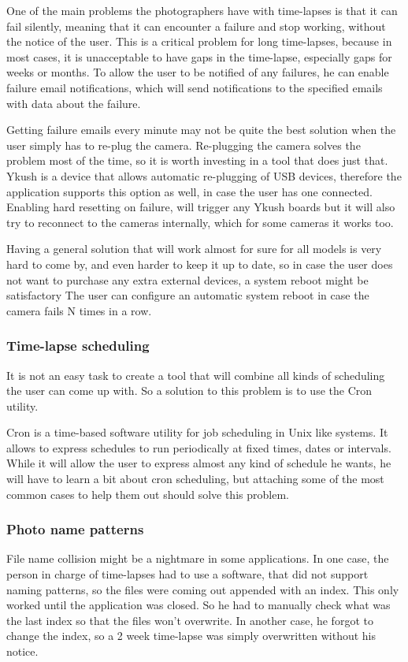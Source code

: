 One of the main problems the photographers have with time-lapses is that it can fail silently, meaning that it can encounter a failure and stop working, without the notice of the user. This is a critical problem for long time-lapses, because in most cases, it is unacceptable to have gaps in the time-lapse, especially gaps for weeks or months. To allow the user to be notified of any failures, he can enable failure email notifications, which will send notifications to the specified emails with data about the failure.

Getting failure emails every minute may not be quite the best solution when the user simply has to re-plug the camera. Re-plugging the camera solves the problem most of the time, so it is worth investing in a tool that does just that. Ykush is a device that allows automatic re-plugging of USB devices, therefore the application supports this option as well, in case the user has one connected. Enabling hard resetting on failure, will trigger any Ykush boards but it will also try to reconnect to the cameras internally, which for some cameras it works too.

Having a general solution that will work almost for sure for all models is very hard to come by, and even harder to keep it up to date, so in case the user does not want to purchase any extra external devices, a system reboot might be satisfactory The user can configure an automatic system reboot in case the camera fails N times in a row.

\subsubsection{Time-lapse scheduling}
It is not an easy task to create a tool that will combine all kinds of scheduling the user can come up with. So a solution to this problem is to use the Cron utility.

Cron is a time-based software utility for job scheduling in Unix like systems. It allows to express schedules to run periodically at fixed times, dates or intervals. While it will allow the user to express almost any kind of schedule he wants, he will have to learn a bit about cron scheduling, but attaching some of the most common cases to help them out should solve this problem.

\subsubsection{Photo name patterns}
File name collision might be a nightmare in some applications. In one case, the person in charge of time-lapses had to use a software, that did not support naming patterns, so the files were coming out appended with an index. This only worked until  the application was closed. So he had to manually check what was the last index so that the files won't overwrite. In another case, he forgot to change the index, so a 2 week time-lapse was simply overwritten without his notice.

